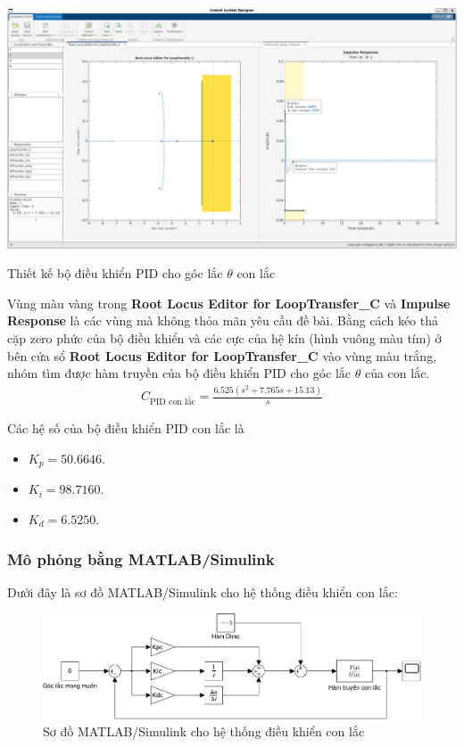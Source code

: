 \documentclass[12pt,a4paper]{article}
\begin{document}
\begin{center}
    \captionsetup{type=figure}
    \includegraphics[width=\linewidth]{thiet_ke_PID_con_lac.png}
    \caption{Thiết kế bộ điều khiển PID cho góc lắc $\theta$ con lắc}
\end{center}

Vùng màu vàng trong \textbf{Root Locus Editor for LoopTransfer\_C} và  \textbf{Impulse Response} là các vùng mà không thỏa mãn yêu cầu đề bài. Bằng cách kéo thả cặp zero phức của bộ điều khiển và các cực của hệ kín (hình vuông màu tím) ở bên cửa sổ \textbf{Root Locus Editor for LoopTransfer\_C} vào vùng màu trắng, nhóm tìm được hàm truyền của bộ điều khiển PID cho góc lắc $\theta$ của con lắc.
\begin{align}
    C_{\text{PID con lắc}} = \frac{6.525 (s^2 + 7.765s + 15.13)}{s}
\end{align}

Các hệ số của bộ điều khiển PID con lắc là
\begin{itemize}
    \item $K_p = 50.6646$.
    \item $K_i = 98.7160$.
    \item $K_d = 6.5250$.
\end{itemize}


\subsubsection{Mô phỏng bằng MATLAB/Simulink}

Dưới đây là sơ đồ MATLAB/Simulink cho hệ thống điều khiển con lắc:
\newpage
\begin{figure}[ht]
    \centering
    \includegraphics[width=\linewidth]{MATLAB_4.pdf}
    \caption{Sơ đồ MATLAB/Simulink cho hệ thống điều khiển con lắc}
\end{figure}
\end{document}
